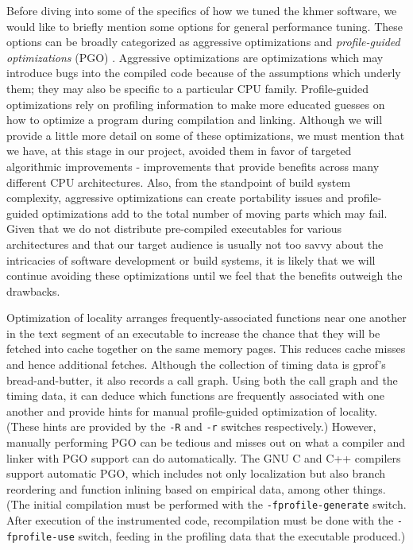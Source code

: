 \documentclass{article}
\begin{document}

Before diving into some of the specifics of how we tuned the khmer software, we
would like to briefly mention some options for general performance tuning.
These options can be broadly categorized as aggressive optimizations and
\textit{profile-guided optimizations} (PGO) \citep{web:PGO}. Aggressive
optimizations are optimizations which may introduce bugs into the compiled code
because of the assumptions which underly them; they may also be specific to a
particular CPU family. Profile-guided optimizations rely on profiling
information to make more educated guesses on how to optimize a program during
compilation and linking. Although we will provide a little more detail on some
of these optimizations, we must mention that we have, at this stage in our
project, avoided them in favor of targeted algorithmic improvements -
improvements that provide benefits across many different CPU architectures.
Also, from the standpoint of build system complexity, aggressive optimizations
can create portability issues and profile-guided optimizations add to the total
number of moving parts which may fail. Given that we do not distribute
pre-compiled executables for various architectures and that our target audience
is usually not too savvy about the intricacies of software development or build
systems, it is likely that we will continue avoiding these optimizations until
we feel that the benefits outweigh the drawbacks.

Optimization of locality arranges frequently-associated functions near one
another in the text segment of an executable to increase the chance that they
will be fetched into cache together on the same memory pages. This reduces
cache misses and hence additional fetches. Although the collection of timing
data is gprof's bread-and-butter, it also records a call graph. Using both the
call graph and the timing data, it can deduce which functions are frequently
associated with one another and provide hints for manual profile-guided
optimization of locality. (These hints are provided by the \texttt{-R} and
\texttt{-r} switches respectively.) However, manually performing PGO can be
tedious and misses out on what a compiler and linker with PGO support can do
automatically. The GNU C and C++ compilers support automatic PGO, which
includes not only localization but also branch reordering and function inlining
based on empirical data, among other things. (The initial compilation must be
performed with the \texttt{-fprofile-generate} switch. After execution of the
instrumented code, recompilation must be done with the \texttt{-fprofile-use}
switch, feeding in the profiling data that the executable produced.)
\end{document}
